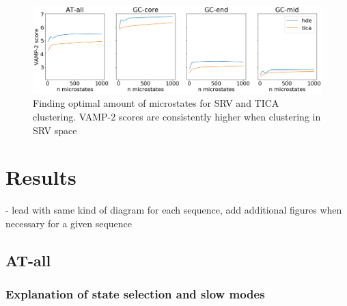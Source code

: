 \documentclass[journal=jpcbfk,manuscript=article]{achemso}
\begin{document}
\begin{figure}[ht!]
	\begin{center}
        \includegraphics[width=\textwidth]{Figs/skeleton/microstate_optimization.png}
        \caption{Finding optimal amount of microstates for SRV and TICA clustering. VAMP-2 scores are consistently higher when clustering in SRV space}
        \label{fig:sample_fray}
	\end{center}
\end{figure}


\section{\label{sec:Results}Results}
- lead with same kind of diagram for each sequence, add additional figures when necessary for a given sequence

\subsection{\label{sec:Results}AT-all}
\subsubsection{\label{sec:Results}Explanation of state selection and slow modes}
\end{document}
